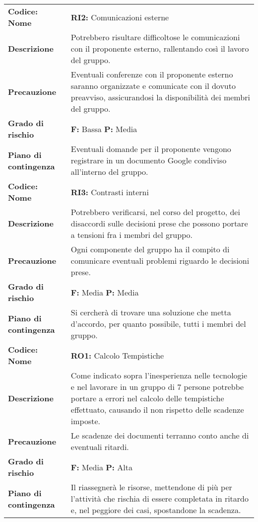 {\begin{longtable}{C{3.5cm} | C{11cm}}
\textbf{Codice: Nome} & \textbf{RI2: }{Comunicazioni esterne}\\ 
\textbf{Descrizione} & Potrebbero risultare difficoltose le comunicazioni con il proponente esterno, rallentando così il lavoro del gruppo.\\ 
\textbf{Precauzione} & Eventuali conferenze con il proponente esterno saranno organizzate e comunicate con il dovuto preavviso, assicurandosi la disponibilità dei membri del gruppo.\\
\textbf{Grado di rischio} & \textbf{F: }Bassa \textbf{P: }Media\\
\textbf{Piano di contingenza} & Eventuali domande per il proponente vengono registrare in un documento Google condiviso all'interno del gruppo.\\
\hline

\textbf{Codice: Nome} & \textbf{RI3: }{Contrasti interni}\\ 
\textbf{Descrizione} & Potrebbero verificarsi, nel corso del progetto, dei disaccordi sulle decisioni prese che possono portare a tensioni fra i membri del gruppo.\\
\textbf{Precauzione} & Ogni componente del gruppo ha il compito di comunicare eventuali problemi riguardo le decisioni prese.\\
\textbf{Grado di rischio} & \textbf{F: }Media {\textbf{P: }}Media\\
\textbf{Piano di contingenza} & Si cercherà di trovare una soluzione che metta d'accordo, per quanto possibile, tutti i membri del gruppo.\\
\hline

\textbf{Codice: Nome} & \textbf{RO1: }{Calcolo Tempistiche}\\
\textbf{Descrizione} & Come indicato sopra l'inesperienza nelle tecnologie e nel lavorare in un gruppo di 7 persone potrebbe portare a errori nel calcolo delle tempistiche effettuato, causando il non rispetto delle scadenze imposte.\\
\textbf{Precauzione} & Le scadenze dei documenti terranno conto anche di eventuali ritardi.\\
\textbf{Grado di rischio} & \textbf{F: }Media \textbf{P: }Alta\\
\textbf{Piano di contingenza} & Il \respProg{} riassegnerà le risorse, mettendone di più per l'attività che rischia di essere completata in ritardo e, nel peggiore dei casi, spostandone la scadenza.\\
\hline


\end{longtable}}

